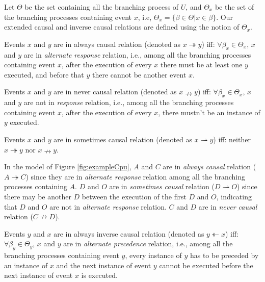 \documentclass[dvips,...]{llncs}
\begin{document}
Let $\Theta$ be the set containing all the branching process of $U$, and $\Theta_{x}$ be the set of the branching processes containing event $x$, i.e, $\Theta_{x}=\{\beta\in\Theta|x\in\beta\}$. Our extended causal and inverse causal relations are defined using the notion of $\Theta_{x}$.

\begin{definition}\label{def:alwaysCausal}
Events $x$ and $y$ are in always causal relation (denoted as $x\twoheadrightarrow y$) iff: $\forall\beta_{x}\in\Theta_{x}$, $x$ and $y$ are in \textit{alternate response} relation, i.e., among all the branching processes containing event $x$, after the execution of every $x$ there must be at least one $y$ executed, and before that $y$ there cannot be another event $x$.
\end{definition}

\begin{definition}\label{def:neverCausal}
Events $x$ and $y$ are in never causal relation (denoted as $x\nrightarrow y$) iff: $\forall\beta_{x}\in\Theta_{x}$, $x$ and $y$ are not in \textit{response} relation, i.e., among all the branching processes containing event $x$, after the execution of every $x$, there mustn't be an instance of $y$ executed.
\end{definition}

\begin{definition}\label{def:sometimesCausal}
Events $x$ and $y$ are in sometimes causal relation (denoted as $x\rightharpoonup y$) iff: neither $x\twoheadrightarrow y$ nor $x\nrightarrow y$.
\end{definition}

\begin{example}\label{ex:causalRelation}
In the model of Figure \ref{fig:exampleCpu}, $A$ and $C$ are in \textit{always causal} relation ($A\twoheadrightarrow C$) since they are in \textit{alternate response} relation among all the branching processes containing $A$. $D$ and $O$ are in \textit{sometimes causal} relation ($D\rightharpoonup O$) since there may be another $D$ between the execution of the first $D$ and $O$, indicating that $D$ and $O$ are not in \textit{alternate response} relation. $C$ and $D$ are in \textit{never causal} relation ($C\nrightarrow D$).
\end{example}

\begin{definition}\label{def:alwaysInverseCausal}
Events $y$ and $x$ are in always inverse causal relation (denoted as $y\twoheadleftarrow x$) iff: $\forall\beta_{y}\in\Theta_{y}$, $x$ and $y$ are in \textit{alternate precedence} relation, i.e., among all the branching processes containing event $y$, every instance of $y$ has to be preceded by an instance of $x$ and the next instance of event $y$ cannot be executed before the next instance of event $x$ is executed.
\end{definition}
\end{document}
